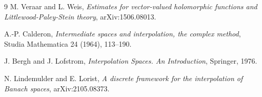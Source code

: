 \documentclass[11pt]{article}
\begin{document}
\begin{thebibliography}{9}
M. Veraar and L. Weis,
\emph{Estimates for vector-valued holomorphic functions and
Littlewood-Paley-Stein theory},
arXiv:1506.08013.

A.-P. Calderon,
\emph{Intermediate spaces and interpolation, the complex method},
Studia Mathematica 24 (1964), 113--190.

J. Bergh and J. Lofstrom,
\emph{Interpolation Spaces. An Introduction},
Springer, 1976.

N. Lindemulder and E. Lorist,
\emph{A discrete framework for the interpolation of Banach spaces},
arXiv:2105.08373.
\end{thebibliography}
\end{document}
